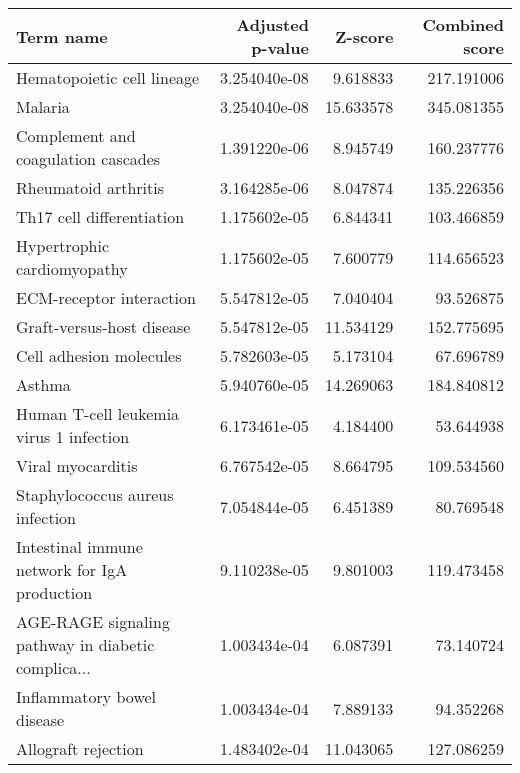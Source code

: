 \begin{tabular}{lrrr}
\toprule
                                         Term name &  Adjusted p-value &   Z-score &  Combined score \\
\midrule
                        Hematopoietic cell lineage &      3.254040e-08 &  9.618833 &      217.191006 \\
                                           Malaria &      3.254040e-08 & 15.633578 &      345.081355 \\
               Complement and coagulation cascades &      1.391220e-06 &  8.945749 &      160.237776 \\
                              Rheumatoid arthritis &      3.164285e-06 &  8.047874 &      135.226356 \\
                         Th17 cell differentiation &      1.175602e-05 &  6.844341 &      103.466859 \\
                       Hypertrophic cardiomyopathy &      1.175602e-05 &  7.600779 &      114.656523 \\
                          ECM-receptor interaction &      5.547812e-05 &  7.040404 &       93.526875 \\
                         Graft-versus-host disease &      5.547812e-05 & 11.534129 &      152.775695 \\
                           Cell adhesion molecules &      5.782603e-05 &  5.173104 &       67.696789 \\
                                            Asthma &      5.940760e-05 & 14.269063 &      184.840812 \\
           Human T-cell leukemia virus 1 infection &      6.173461e-05 &  4.184400 &       53.644938 \\
                                 Viral myocarditis &      6.767542e-05 &  8.664795 &      109.534560 \\
                   Staphylococcus aureus infection &      7.054844e-05 &  6.451389 &       80.769548 \\
      Intestinal immune network for IgA production &      9.110238e-05 &  9.801003 &      119.473458 \\
AGE-RAGE signaling pathway in diabetic complica... &      1.003434e-04 &  6.087391 &       73.140724 \\
                        Inflammatory bowel disease &      1.003434e-04 &  7.889133 &       94.352268 \\
                               Allograft rejection &      1.483402e-04 & 11.043065 &      127.086259 \\

\end{tabular}
